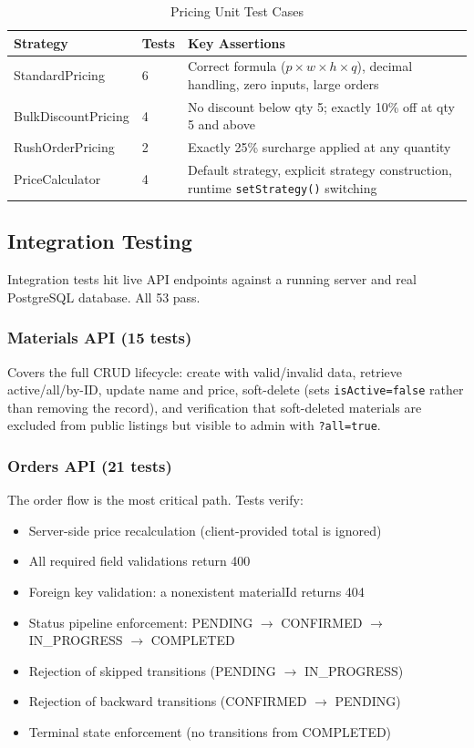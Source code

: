 \documentclass[12pt, a4paper]{article}
\begin{document}
\begin{table}[H]
\centering
\caption{Pricing Unit Test Cases}
\begin{tabularx}{\textwidth}{llX}
\toprule
\textbf{Strategy} & \textbf{Tests} & \textbf{Key Assertions} \\
\midrule
StandardPricing      & 6 & Correct formula ($p \times w \times h \times q$), decimal handling, zero inputs, large orders \\
BulkDiscountPricing  & 4 & No discount below qty 5; exactly 10\% off at qty 5 and above \\
RushOrderPricing     & 2 & Exactly 25\% surcharge applied at any quantity \\
PriceCalculator      & 4 & Default strategy, explicit strategy construction, runtime \texttt{setStrategy()} switching \\
\bottomrule
\end{tabularx}
\end{table}

\subsection{Integration Testing}

Integration tests hit live API endpoints against a running server and real PostgreSQL database. All 53 pass.

\subsubsection{Materials API (15 tests)}

Covers the full CRUD lifecycle: create with valid/invalid data, retrieve active/all/by-ID, update name and price, soft-delete (sets \texttt{isActive=false} rather than removing the record), and verification that soft-deleted materials are excluded from public listings but visible to admin with \texttt{?all=true}.

\subsubsection{Orders API (21 tests)}

The order flow is the most critical path. Tests verify:

\begin{itemize}[noitemsep]
  \item Server-side price recalculation (client-provided total is ignored)
  \item All required field validations return 400
  \item Foreign key validation: a nonexistent materialId returns 404
  \item Status pipeline enforcement: PENDING $\to$ CONFIRMED $\to$ IN\_PROGRESS $\to$ COMPLETED
  \item Rejection of skipped transitions (PENDING $\to$ IN\_PROGRESS)
  \item Rejection of backward transitions (CONFIRMED $\to$ PENDING)
  \item Terminal state enforcement (no transitions from COMPLETED)
\end{itemize}
\end{document}
